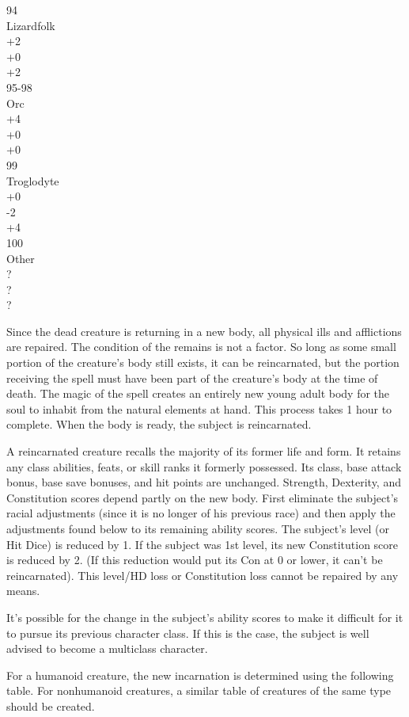 {{	94\\
	Lizardfolk\\
	+2\\
	+0\\
	+2\\
	95-98\\
	Orc\\
	+4\\
	+0\\
	+0\\
	99\\
	Troglodyte\\
	+0\\
	-2\\
	+4\\
	100\\
	Other\\
	?\\
	?\\
	?\\
}
{
	Since the dead creature is returning in a new body, all physical ills and afflictions are repaired. The condition of the remains is not a factor. So long as some small portion of the creature's body still exists, it can be reincarnated, but the portion receiving the spell must have been part of the creature's body at the time of death. The magic of the spell creates an entirely new young adult body for the soul to inhabit from the natural elements at hand. This process takes 1 hour to complete.  When the body is ready, the subject is reincarnated.

	A reincarnated creature recalls the majority of its former life and form. It retains any class abilities, feats, or skill ranks it formerly possessed. Its class, base attack bonus, base save bonuses, and hit points are unchanged. Strength, Dexterity, and Constitution scores depend partly on the new body. First eliminate the subject's racial adjustments (since it is no longer of his previous race) and then apply the adjustments found below to its remaining ability scores. The subject's level (or Hit Dice) is reduced by 1. If the subject was 1st level, its new Constitution score is reduced by 2. (If this reduction would put its Con at 0 or lower, it can't be reincarnated). This level/HD loss or Constitution loss cannot be repaired by any means.

	It's possible for the change in the subject's ability scores to make it difficult for it to pursue its previous character class. If this is the case, the subject is well advised to become a multiclass character.

	For a humanoid creature, the new incarnation is determined using the following table. For nonhumanoid creatures, a similar table of creatures of the same type should be created.

}}
